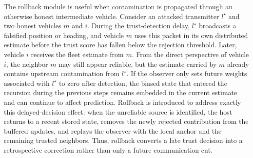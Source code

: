 \documentclass[journal,twoside]{IEEEtran}
\begin{document}
The rollback module is useful when contamination is propagated through an otherwise honest intermediate vehicle. Consider an attacked transmitter $l^{\star}$ and two honest vehicles $m$ and $i$. During the trust-detection delay, $l^{\star}$ broadcasts a falsified position or heading, and vehicle $m$ uses this packet in its own distributed estimate before the trust score has fallen below the rejection threshold. Later, vehicle $i$ receives the fleet estimate from $m$. From the direct perspective of vehicle $i$, the neighbor $m$ may still appear reliable, but the estimate carried by $m$ already contains upstream contamination from $l^{\star}$. If the observer only sets future weights associated with $l^{\star}$ to zero after detection, the biased state that entered the recursion during the previous steps remains embedded in the current estimate and can continue to affect prediction. Rollback is introduced to address exactly this delayed-decision effect: when the unreliable source is identified, the host returns to a recent stored state, removes the newly rejected contribution from the buffered updates, and replays the observer with the local anchor and the remaining trusted neighbors. Thus, rollback converts a late trust decision into a retrospective correction rather than only a future communication cut.
\end{document}
